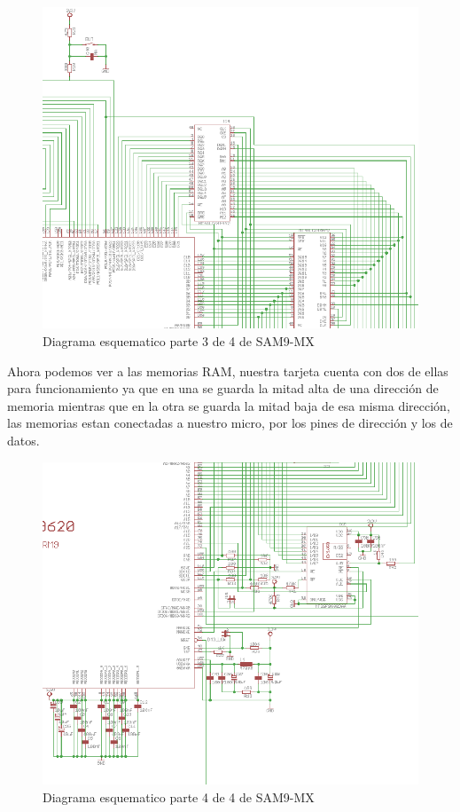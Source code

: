 \begin{figure}[H]
\includegraphics[scale=0.55]{samEsq3}
\caption{Diagrama esquematico parte 3 de 4 de SAM9-MX}\label{fig:samEsq3}
\end{figure}

Ahora podemos ver a las memorias RAM, nuestra tarjeta cuenta con dos de ellas para funcionamiento ya que en una se guarda la mitad alta de una direcci\'on de memoria mientras que en la otra se guarda la mitad baja de esa misma direcci\'on, las memorias estan conectadas a nuestro micro, por los pines de direcci\'on y los de datos.\medskip

\begin{figure}[H]
\includegraphics[scale=0.55]{samEsq4}
\caption{Diagrama esquematico parte 4 de 4 de SAM9-MX}\label{fig:samEsq4}
\end{figure}


